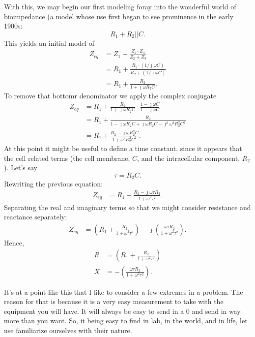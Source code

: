 \documentclass[11pt]{book}
\begin{document}
With this, we may begin our first modeling foray into the wonderful world of bioimpedance (a model whose use first began to see prominence in the early 1900s: 
\begin{equation}
	R_1+R_2\vert\vert C.
\end{equation}
This yields an initial model of
\begin{align}
	Z_{eq} &= Z_1 + \frac{Z_2\cdot Z_3}{Z_2 + Z_3} \\
	&= R_1 + \frac{R_2\cdot (1/\jmath \omega C)}{R_2 + (1/\jmath \omega C)} \\
	&= R_1 + \frac{R_2}{1 + \jmath \omega R_2 C}.
\end{align}
To remove that bottomr denominator we apply the complex conjugate
\begin{align}
	Z_{eq} &= R_1 + \frac{R_2}{1 + \jmath \omega R_2 C}\cdot\frac{1-\jmath\omega C}{1 - \jmath\omega C} \\
	&= R_1 + \frac{R_2}{1 - \jmath\omega R_2 C + \jmath\omega R_2 C - \jmath^2 \omega^2 R_2^2C^2} \\
	&= R_1 + \frac{R_2 - \jmath\omega R_2^2 C}{1 + \omega^2 R_2^2 C^2}.
\end{align}
At this point it might be useful to define a time constant, since it appears that the cell related terms (the cell membrane, $C$, and the intracellular component, $R_2$). Let's say
\begin{equation}
	\tau = R_2 C.
\end{equation}
Rewriting the previous equation:
\begin{align}
	Z_{eq} &= R_1 + \frac{R_2 - \jmath\omega \tau R_2}{1 + \omega^2 \tau^2}.
\end{align}
Separating the real and imaginary terms so that we might consider resistance and reactance separately:
\begin{align}
	Z_{eq} &= \left(R_1 + \frac{R_2}{1 + \omega^2 \tau^2}\right) - \jmath\left(\frac{\omega \tau R_2}{1 + \omega^2 \tau^2}\right).
\end{align}
Hence, 
\begin{align}
	R &= \left(R_1 + \frac{R_2}{1 + \omega^2 \tau^2}\right) \\
	X &= - \left(\frac{\omega \tau R_2}{1 + \omega^2 \tau^2}\right).
\end{align}

It's at a point like this that I like to consider a few extremes in a problem. The reason for that is because it is a very easy measurement to take with the equipment you will have. It will always be easy to send in a 0 and send in way more than you want. So, it being easy to find in lab, in the world, and in life, let use familiarize ourselves with their nature.
\end{document}
